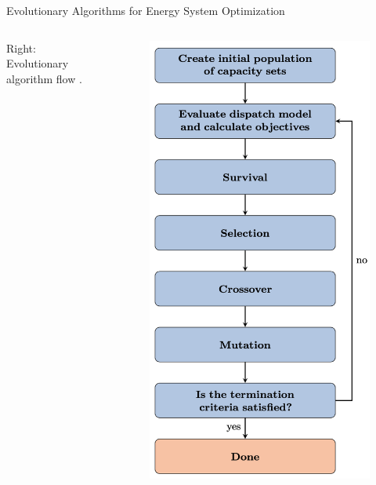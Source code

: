 \begin{frame}
\begin{block}{Evolutionary Algorithms for Energy System Optimization}
\begin{columns}
            Right: Evolutionary algorithm flow \cite{deb_evolutionary_2014}.
            \column[t]{4cm}
            \centering
            \begin{figure}
            \includegraphics[width=0.8\linewidth]{images/ea-flow.png}  
            \end{figure}
        \end{columns}
    \end{block}
\end{frame}

